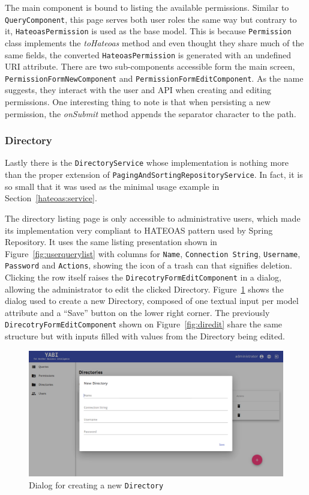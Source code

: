 The main component is bound to listing the available permissions. Similar to \texttt{QueryComponent}, this page serves both user roles the same way but contrary to it, \texttt{HateoasPermission} is used as the base model. This is because \texttt{Permission} class implements the \textit{toHateoas} method and even thought they share much of the same fields, the converted \texttt{HateoasPermission} is generated with an undefined \gls{URI} attribute. There are two sub-components accessible form the main screen, \texttt{PermissionFormNewComponent} and \texttt{PermissionFormEditComponent}. As the name suggests, they interact with the user and \gls{API} when creating and editing permissions. One interesting thing to note is that when persisting a new permission, the \textit{onSubmit} method appends the separator character to the path.

\subsubsection{Directory}
Lastly there is the \texttt{DirectoryService} whose implementation is nothing more than the proper extension of \texttt{PagingAndSortingRepositoryService}. In fact, it is so small that it was used as the minimal usage example in Section~\ref{hateoas:service}.

The directory listing page is only accessible to administrative users, which made its implementation very compliant to  \gls{HATEOAS} pattern used by Spring Repository. It uses the same listing presentation shown in Figure~\ref{fig:userquerylist} with columns for \texttt{Name}, \texttt{Connection String}, \texttt{Username}, \texttt{Password} and \texttt{Actions}, showing the icon of a trash can that signifies deletion. Clicking the row itself raises the \texttt{DirecotryFormEditComponent} in a dialog, allowing the administrator to edit the clicked Directory.
Figure~\ref{fig:dirnew} shows the dialog used to create a new Directory, composed of one textual input per model attribute and a ``Save'' button on the lower right corner. The previously \texttt{DirecotryFormEditComponent} shown on Figure~\ref{fig:diredit} share the same structure but with inputs filled with values from the Directory being edited.

\begin{figure}
  \centering
  \includegraphics[width=.8\textwidth]{images/screenshots/directory/directory-new}
  \caption{Dialog for creating a new \texttt{Directory}}\label{fig:dirnew}
\end{figure}

